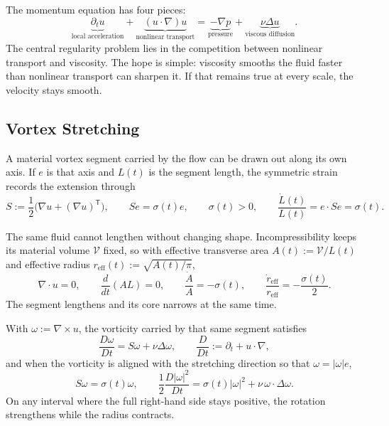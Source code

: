 
The momentum equation has four pieces:
\[
  \underbrace{\partial_t u}_{\text{local acceleration}}
  +
  \underbrace{(u\cdot\nabla)u}_{\text{nonlinear transport}}
  =
  \underbrace{-\nabla p}_{\text{pressure}}
  +
  \underbrace{\nu\Delta u}_{\text{viscous diffusion}}.
\]
The central regularity problem lies in the competition between nonlinear transport and viscosity.
The hope is simple: viscosity smooths the fluid faster than nonlinear transport can sharpen it.
If that remains true at every scale, the velocity stays smooth.

\subsection{Vortex Stretching}\label{sub:ThePerfectlyStretchingVortex}

A material vortex segment carried by the flow can be drawn out along its own axis. If \(e\) is that axis and \(L(t)\) is the segment length, the symmetric strain records the extension through
\[
  S:=\frac12\bigl(\nabla u+(\nabla u)^{\mathsf T}\bigr),
  \qquad
  Se=\sigma(t)e,
  \qquad
  \sigma(t)>0,
  \qquad
  \frac{\dot L(t)}{L(t)}
  =
  e\cdot Se
  =
  \sigma(t).
\]

The same fluid cannot lengthen without changing shape. Incompressibility keeps its material volume \(\mathcal V\) fixed, so with effective transverse area \(A(t):=\mathcal V/L(t)\) and effective radius \(r_{\mathrm{eff}}(t):=\sqrt{A(t)/\pi}\),
\[
  \nabla\cdot u=0,
  \qquad
  \frac{d}{dt}(A L)=0,
  \qquad
  \frac{\dot A}{A}=-\sigma(t),
  \qquad
  \frac{\dot r_{\mathrm{eff}}}{r_{\mathrm{eff}}}
  =
  -\frac{\sigma(t)}{2}.
\]
The segment lengthens and its core narrows at the same time.

With \(\omega:=\nabla\times u\), the vorticity carried by that same segment satisfies
\[
  \frac{D\omega}{Dt}
  =
  S\omega+\nu\Delta\omega,
  \qquad
  \frac{D}{Dt}
  :=
  \partial_t+u\cdot\nabla,
\]
and when the vorticity is aligned with the stretching direction so that \(\omega=|\omega|e\),
\[
  S\omega
  =
  \sigma(t)\omega,
  \qquad
  \frac12\frac{D|\omega|^2}{Dt}
  =
  \sigma(t)|\omega|^2
  +
  \nu\,\omega\cdot\Delta\omega.
\]
On any interval where the full right-hand side stays positive, the rotation strengthens while the radius contracts.

